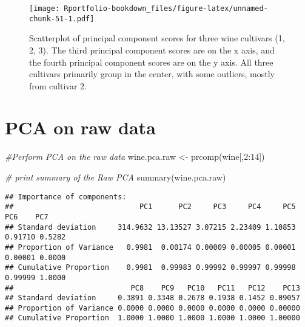 \documentclass[
]{book}
\newenvironment{Shaded}{\begin{snugshade}}{\end{snugshade}}
\newcommand{\AttributeTok}[1]{\textcolor[rgb]{0.77,0.63,0.00}{#1}}
\newcommand{\CommentTok}[1]{\textcolor[rgb]{0.56,0.35,0.01}{\textit{#1}}}
\newcommand{\DecValTok}[1]{\textcolor[rgb]{0.00,0.00,0.81}{#1}}
\newcommand{\FloatTok}[1]{\textcolor[rgb]{0.00,0.00,0.81}{#1}}
\newcommand{\FunctionTok}[1]{\textcolor[rgb]{0.00,0.00,0.00}{#1}}
\newcommand{\NormalTok}[1]{#1}
\newcommand{\OtherTok}[1]{\textcolor[rgb]{0.56,0.35,0.01}{#1}}
\newcommand{\SpecialCharTok}[1]{\textcolor[rgb]{0.00,0.00,0.00}{#1}}
\newcommand{\StringTok}[1]{\textcolor[rgb]{0.31,0.60,0.02}{#1}}
\begin{document}
\begin{Shaded}
\end{Shaded}

\begin{figure}
\centering
\texttt{[image: Rportfolio-bookdown\_files/figure-latex/unnamed-chunk-51-1.pdf]}
\caption{\label{fig:unnamed-chunk-51}Scatterplot of principal component scores for three wine cultivars (1, 2, 3). The third principal component scores are on the x axis, and the fourth principal component scores are on the y axis. All three cultivars primarily group in the center, with some outliers, mostly from cultivar 2.}
\end{figure}

\hypertarget{pca-on-raw-data}{%
\section{PCA on raw data}\label{pca-on-raw-data}}

\begin{Shaded}
\begin{Highlighting}[]
\CommentTok{\#Perform PCA on the raw data}
\NormalTok{wine.pca.raw }\OtherTok{\textless{}{-}} \FunctionTok{prcomp}\NormalTok{(wine[,}\DecValTok{2}\SpecialCharTok{:}\DecValTok{14}\NormalTok{])}

\CommentTok{\# print summary of the Raw PCA}
\FunctionTok{summary}\NormalTok{(wine.pca.raw)}
\end{Highlighting}
\end{Shaded}

\begin{verbatim}
## Importance of components:
##                             PC1      PC2     PC3     PC4     PC5     PC6    PC7
## Standard deviation     314.9632 13.13527 3.07215 2.23409 1.10853 0.91710 0.5282
## Proportion of Variance   0.9981  0.00174 0.00009 0.00005 0.00001 0.00001 0.0000
## Cumulative Proportion    0.9981  0.99983 0.99992 0.99997 0.99998 0.99999 1.0000
##                           PC8    PC9   PC10   PC11   PC12    PC13
## Standard deviation     0.3891 0.3348 0.2678 0.1938 0.1452 0.09057
## Proportion of Variance 0.0000 0.0000 0.0000 0.0000 0.0000 0.00000
## Cumulative Proportion  1.0000 1.0000 1.0000 1.0000 1.0000 1.00000
\end{verbatim}
\end{document}
